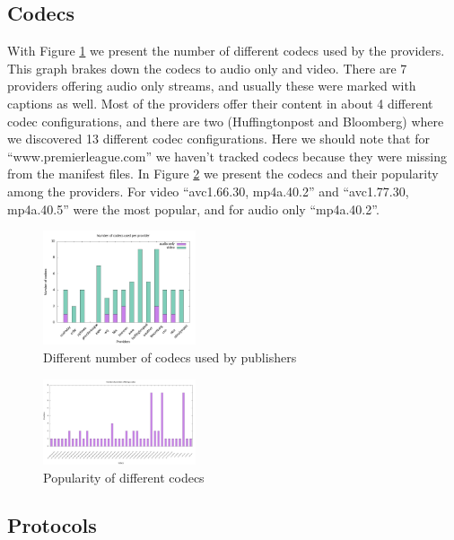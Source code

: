 \documentclass[]{sig-alternate-10pt}
\begin{document}
\hypertarget{codecs}{%
\subsection{Codecs}\label{codecs}}

With Figure \ref{fig:codecs1} we present the number of different codecs
used by the providers. This graph brakes down the codecs to audio only
and video. There are 7 providers offering audio only streams, and
usually these were marked with captions as well. Most of the providers
offer their content in about 4 different codec configurations, and there
are two (Huffingtonpost and Bloomberg) where we discovered 13 different
codec configurations. Here we should note that for
``www.premierleague.com'' we haven't tracked codecs because they were
missing from the manifest files. In Figure \ref{fig:codecs2} we present
the codecs and their popularity among the providers. For video
``avc1.66.30, mp4a.40.2'' and ``avc1.77.30, mp4a.40.5'' were the most
popular, and for audio only ``mp4a.40.2''.

\begin{figure}
\centering
\includegraphics[width=0.4\textwidth]{codecs_bar_plot1.jpg}
\caption{Different number of codecs used by publishers}
\label{fig:codecs1}
\end{figure}
\begin{figure}
\centering
\includegraphics[width=0.4\textwidth]{codecs_bar_plot2.jpg}
\caption{Popularity of different codecs}
\label{fig:codecs2}
\end{figure}

\hypertarget{protocols}{%
\subsection{Protocols}\label{protocols}}
\end{document}
